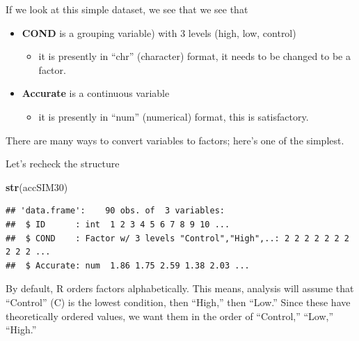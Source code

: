 \documentclass[
  english,
]{book}
\newenvironment{Shaded}{\begin{snugshade}}{\end{snugshade}}
\newcommand{\KeywordTok}[1]{\textcolor[rgb]{0.13,0.29,0.53}{\textbf{#1}}}
\newcommand{\NormalTok}[1]{#1}
\newcommand{\OperatorTok}[1]{\textcolor[rgb]{0.81,0.36,0.00}{\textbf{#1}}}
\newcommand{\StringTok}[1]{\textcolor[rgb]{0.31,0.60,0.02}{#1}}
\providecommand{\tightlist}{%
  \setlength{\itemsep}{0pt}\setlength{\parskip}{0pt}}
\begin{document}
If we look at this simple dataset, we see that we see that

\begin{itemize}
\tightlist
\item
  \textbf{COND} is a grouping variable) with 3 levels (high, low, control)

  \begin{itemize}
  \tightlist
  \item
    it is presently in ``chr'' (character) format, it needs to be changed to be a factor.
  \end{itemize}
\item
  \textbf{Accurate} is a continuous variable

  \begin{itemize}
  \tightlist
  \item
    it is presently in ``num'' (numerical) format, this is satisfactory.
  \end{itemize}
\end{itemize}

There are many ways to convert variables to factors; here's one of the simplest.

\begin{Shaded}
\end{Shaded}

Let's recheck the structure

\begin{Shaded}
\begin{Highlighting}[]
\KeywordTok{str}\NormalTok{(accSIM30)}
\end{Highlighting}
\end{Shaded}

\begin{verbatim}
## 'data.frame':    90 obs. of  3 variables:
##  $ ID      : int  1 2 3 4 5 6 7 8 9 10 ...
##  $ COND    : Factor w/ 3 levels "Control","High",..: 2 2 2 2 2 2 2 2 2 2 ...
##  $ Accurate: num  1.86 1.75 2.59 1.38 2.03 ...
\end{verbatim}

By default, R orders factors alphabetically. This means, analysis will assume that ``Control'' (C) is the lowest condition, then ``High,'' then ``Low.'' Since these have theoretically ordered values, we want them in the order of ``Control,'' ``Low,'' ``High.''
\end{document}

